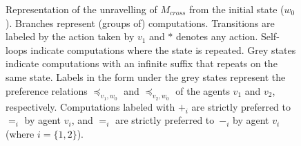 \begin{figure}[h]
{
}

     \caption{Representation of the unravelling of $M_{cross}$ from the initial state ($w_0$). Branches represent (groups of) computations. Transitions are labeled by the action taken by $v_1$ and $*$ denotes any action. Self-loops indicate computations where the state is repeated. %
     Grey states indicate computations with an infinite suffix that repeats on the same state. Labels in the form under the grey states represent the preference relations  $\preceq_{v_1,w_0}$ and $\preceq_{v_2,w_0}$  of the agents $v_1$ and $v_2$, respectively.  Computations labeled with $+_i$ are strictly  preferred to $=_i$ by agent $v_i$, and  $=_i$ are strictly preferred to~$-_i$ by agent $v_i$ (where $i = \{1,2\}$).     } 
     \label{fig:pref} 
 \end{figure}